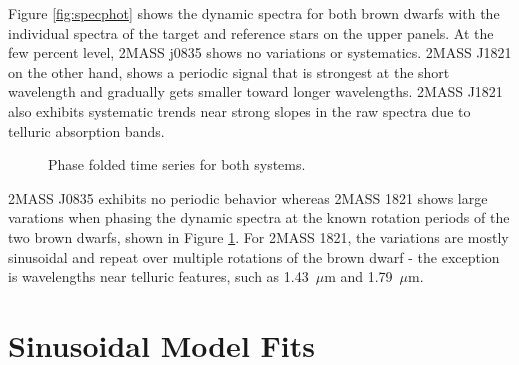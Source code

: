 \documentclass[twocolumn]{aastex6}
\begin{document}
Figure \ref{fig:specphot} shows the dynamic spectra for both brown dwarfs with the individual spectra of the target and reference stars on the upper panels.
At the few percent level, 2MASS j0835 shows no variations or systematics.
2MASS J1821 on the other hand, shows a periodic signal that is strongest at the short wavelength and gradually gets smaller toward longer wavelengths.
2MASS J1821 also exhibits systematic trends near strong slopes in the raw spectra due to telluric absorption bands.

\begin{figure}[!t]
\centering
{}
	\caption{Phase folded time series for both systems.}
	\label{fig:tserPfold}
\end{figure} 

2MASS J0835 exhibits no periodic behavior whereas 2MASS 1821 shows large varations when phasing the dynamic spectra at the known rotation periods of the two brown dwarfs, shown in Figure \ref{fig:tserPfold}.
For 2MASS 1821, the variations are mostly sinusoidal and repeat over multiple rotations of the brown dwarf - the exception is wavelengths near telluric features, such as 1.43~$\mu$m and 1.79~$\mu$m.


\section{Sinusoidal Model Fits}
\end{document}
